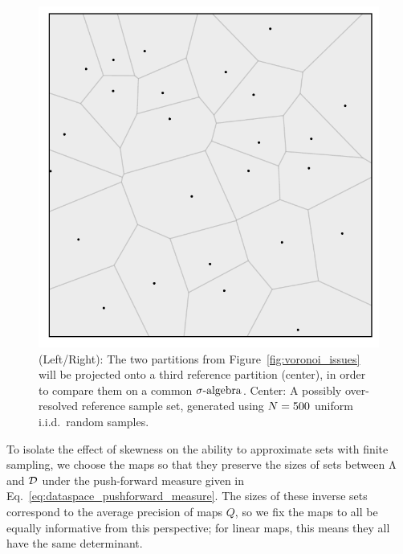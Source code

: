 \begin{figure}[ht]
\begin{minipage}{.4\textwidth}
	\end{minipage}
		\begin{minipage}{.275\textwidth}
		\includegraphics[width=\linewidth]{./images/voronoi_diagrams/voronoi_diagram_N25_r10_no_label}
	\end{minipage}
\caption{
(Left/Right): The two partitions from Figure~\ref{fig:voronoi_issues} will be projected onto a third reference partition (center), in order to compare them on a common $\sigma\text{-algebra}$.
Center: A possibly over-resolved reference sample set, generated using $N = 500$ uniform i.i.d.~random samples.
}
\label{fig:voronoi_sols}
\end{figure}

To isolate the effect of skewness on the ability to approximate sets with finite sampling, we choose the maps so that they preserve the sizes of sets between ${\Lambda}$ and $\mathcal{D}$ under the push-forward measure given in Eq.~\eqref{eq:dataspace_pushforward_measure}.
The sizes of these inverse sets correspond to the average precision of maps $Q$, so we fix the maps to all be equally informative from this perspective; for linear maps, this means they all have the same determinant.

